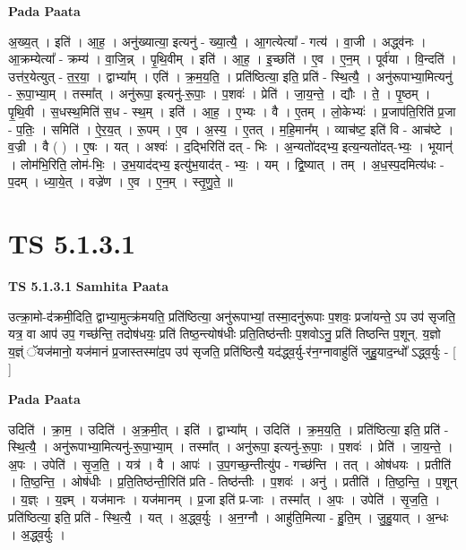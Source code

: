 \documentclass[17pt]{extarticle}
\begin{document}
\textbf{Pada Paata} \newline

अ॒ख्य॒त् । इति॑ । आ॒ह॒ । अनु॑ख्यात्या॒ इत्यनु॑ - ख्या॒त्यै॒ । आ॒गत्येत्या᳚ - गत्य॑ । वा॒जी । अद्ध्व॑नः । आ॒क्रम्येत्या᳚ - क्रम्य॑ । वा॒जि॒न्न् । पृ॒थि॒वीम् । इति॑ । आ॒ह॒ । इ॒च्छति॑ । ए॒व । ए॒न॒म् । पूर्व॑या । वि॒न्दति॑ । उत्त॑र॒येत्युत् - त॒र॒या॒ । द्वाभ्या᳚म् । एति॑ । क्र॒म॒य॒ति॒ । प्रति॑ष्ठित्या॒ इति॒ प्रति॑ - स्थि॒त्यै॒ । अनु॑रूपाभ्या॒मित्यनु॑ - रू॒पा॒भ्या॒म् । तस्मा᳚त् । अनु॑रूपा॒ इत्यनु॑-रू॒पाः॒ । प॒शवः॑ । प्रेति॑ । जा॒य॒न्ते॒ । द्यौः । ते॒ । पृ॒ष्ठम् । पृ॒थि॒वी । स॒धस्थ॒मिति॑ स॒ध - स्थ॒म् । इति॑ । आ॒ह॒ । ए॒भ्यः । वै । ए॒तम् । लो॒केभ्यः॑ । प्र॒जाप॑ति॒रिति॑ प्र॒जा - प॒तिः॒ । समिति॑ । ऐ॒र॒य॒त् । रू॒पम् । ए॒व । अ॒स्य॒ । ए॒तत् । म॒हि॒मान᳚म् । व्याच॑ष्ट॒ इति॑ वि - आच॑ष्टे । व॒ज्री । वै ( ) । ए॒षः । यत् । अश्वः॑ । द॒द्भिरिति॑ दत् - भिः । अ॒न्यतो॑दद्भ्य॒ इत्य॒न्यतो॑दत्-भ्यः॒ । भूयान्॑ । लोम॑भि॒रिति॒ लोम॑-भिः॒ । उ॒भ॒याद॑द्भ्य॒ इत्यु॑भ॒याद॑त् - भ्यः॒ । यम् । द्वि॒ष्यात् । तम् । अ॒ध॒स्प॒दमित्य॑धः - प॒दम् । ध्या॒ये॒त् । वज्रे॑ण । ए॒व । ए॒न॒म् । स्तृ॒णु॒ते॒ ॥  \newline




\section*{ TS 5.1.3.1 }

\textbf{TS 5.1.3.1 } \newline
\textbf{Samhita Paata} \newline

उत्क्रा॒मो-द॑क्रमी॒दिति॒ द्वाभ्या॒मुत्क्र॑मयति॒ प्रति॑ष्ठित्या॒ अनु॑रूपाभ्यां॒ तस्मा॒दनु॑रूपाः प॒शवः॒ प्रजा॑यन्ते॒ ऽप उप॑ सृजति॒ यत्र॒ वा आप॑ उप॒ गच्छ॑न्ति॒ तदोष॑धयः॒ प्रति॑ तिष्ठ॒न्त्योष॑धीः प्रति॒तिष्ठ॑न्तीः प॒शवोऽनु॒ प्रति॑ तिष्ठन्ति प॒शून्. य॒ज्ञो य॒ज्ञ्ं ॅयज॑मानो॒ यज॑मानं प्र॒जास्तस्मा॑द॒प उप॑ सृजति॒ प्रति॑ष्ठित्यै॒ यद॑द्ध्व॒र्यु-र॑न॒ग्नावाहु॑तिं जुहु॒याद॒न्धो᳚ ऽद्ध्व॒र्युः - [  ] \newline

\textbf{Pada Paata} \newline

उदिति॑ । क्रा॒म॒ । उदिति॑ । अ॒क्र॒मी॒त् । इति॑ । द्वाभ्या᳚म् । उदिति॑ । क्र॒म॒य॒ति॒ । प्रति॑ष्ठित्या॒ इति॒ प्रति॑ - स्थि॒त्यै॒ । अनु॑रूपाभ्या॒मित्यनु॑-रू॒पा॒भ्या॒म् । तस्मा᳚त् । अनु॑रूपा॒ इत्यनु॑-रू॒पाः॒ । प॒शवः॑ । प्रेति॑ । जा॒य॒न्ते॒ । अ॒पः । उपेति॑ । सृ॒ज॒ति॒ । यत्र॑ । वै । आपः॑ । उ॒प॒गच्छ॒न्तीत्यु॑प - गच्छ॑न्ति । तत् । ओष॑धयः । प्रतीति॑ । ति॒ष्ठ॒न्ति॒ । ओष॑धीः । प्र॒ति॒तिष्ठ॑न्ती॒रिति॑ प्रति - तिष्ठ॑न्तीः । प॒शवः॑ । अनु॑ । प्रतीति॑ । ति॒ष्ठ॒न्ति॒ । प॒शून् । य॒ज्ञ्ः । य॒ज्ञ्म् । यज॑मानः । यज॑मानम् । प्र॒जा इति॑ प्र-जाः । तस्मा᳚त् । अ॒पः । उपेति॑ । सृ॒ज॒ति॒ । प्रति॑ष्ठित्या॒ इति॒ प्रति॑ - स्थि॒त्यै॒ । यत् । अ॒द्ध्व॒र्युः । अ॒न॒ग्नौ । आहु॑ति॒मित्या - हु॒ति॒म् । जु॒हु॒यात् । अ॒न्धः । अ॒द्ध्व॒र्युः ।  \newline
\end{document}
